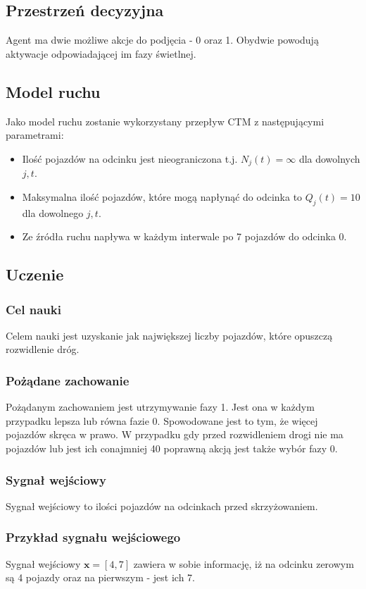 \documentclass[12pt]{book}
\theoremstyle{plain}
\begin{document}
\subsection{Przestrzeń decyzyjna}
Agent ma dwie możliwe akcje do podjęcia - 0 oraz 1. Obydwie powodują aktywacje odpowiadającej im fazy świetlnej.

\subsection{Model ruchu}
Jako model ruchu zostanie wykorzystany przepływ CTM z następującymi parametrami:
\begin{itemize}
	\item Ilość pojazdów na odcinku jest nieograniczona t.j. $N_j(t)=\infty$ dla dowolnych $j,t$.
	\item Maksymalna ilość pojazdów, które mogą napłynąć do odcinka to $Q_j(t)=10$ dla dowolnego $j,t$.
	\item Ze źródła ruchu napływa w każdym interwale po 7 pojazdów do odcinka 0.
\end{itemize}

\subsection{Uczenie}
\subsubsection*{Cel nauki}
Celem nauki jest uzyskanie jak największej liczby pojazdów, które opuszczą rozwidlenie dróg.
\subsubsection*{Pożądane zachowanie}
Pożądanym zachowaniem jest utrzymywanie fazy 1. Jest ona w każdym przypadku lepsza lub równa fazie 0. Spowodowane jest to tym, że więcej pojazdów skręca w prawo. W przypadku gdy przed rozwidleniem drogi nie ma pojazdów lub jest ich conajmniej 40 poprawną akcją jest także wybór fazy 0.
\subsubsection*{Sygnał wejściowy}
Sygnał wejściowy to ilości pojazdów na odcinkach przed skrzyżowaniem.
\subsubsection*{Przykład sygnału wejściowego}
Sygnał wejściowy $ \textbf{x}=[4,7] $ zawiera w sobie informację, iż na odcinku zerowym są 4 pojazdy oraz na pierwszym - jest ich 7. 
\end{document}
